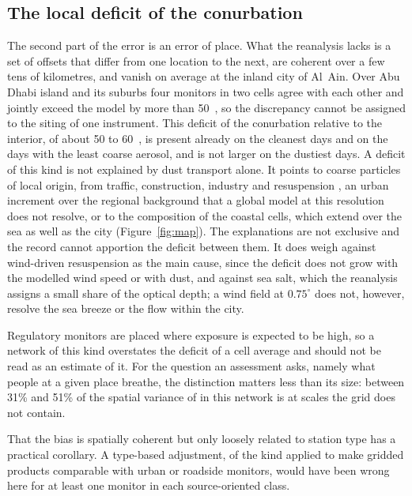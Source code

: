 \subsection{The local deficit of the conurbation}
\label{sec:disc-local}

The second part of the error is an error of place. What the reanalysis lacks is a set of offsets
that differ from one location to the next, are coherent over a few tens of kilometres, and vanish
on average at the inland city of Al~Ain. Over Abu Dhabi island and its suburbs four monitors in
two cells agree with each other and jointly exceed the model by more than 50~\ugm{}, so the
discrepancy cannot be assigned to the siting of one instrument. This deficit of the conurbation
relative to the interior, of about 50 to 60~\ugm{}, is
present already on the cleanest days and on the days with the least coarse aerosol, and is
not larger on the dustiest days. A deficit of this
kind is not explained by dust transport alone. It points to coarse particles of local origin, from traffic, construction, industry and resuspension \citep{thorpe2008,amato2009}, an urban
increment over the regional background \citep{lenschow2001} that a global model at this
resolution does not resolve, or to the composition of
the coastal cells, which extend over the sea as well as the city (Figure~\ref{fig:map}). The
explanations are not exclusive and the record cannot apportion the deficit between them. It does
weigh against wind-driven resuspension as the main cause, since the deficit does not grow with
the modelled wind speed or with dust, and against sea salt, which the reanalysis assigns a small
share of the optical depth; a wind field at $0.75^{\circ}$ does not, however, resolve the sea
breeze or the flow within the city.

Regulatory monitors are placed where exposure is expected to be high, so a network of this kind
overstates the deficit of a cell average and should not be read as an estimate of it. For the
question an assessment asks, namely what people at a given place breathe, the distinction matters
less than its size: between 31\% and 51\% of the spatial variance of \pmten{} in this
network is at scales the grid does not contain.

That the bias is spatially coherent but only loosely related to station type has a practical
corollary. A type-based adjustment, of the kind applied to make gridded products comparable with
urban or roadside monitors, would have been wrong here for at least one monitor in each
source-oriented class.

